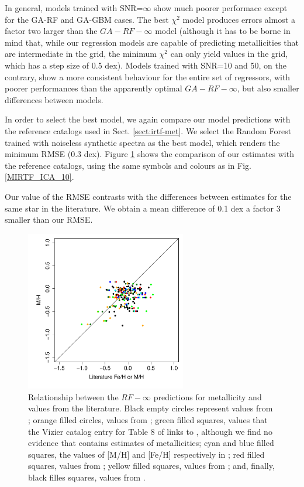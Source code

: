 In general, models trained with SNR=$\infty$ show much poorer
performace except for the GA-RF and GA-GBM cases. The best $\chi^2$
model produces errors almost a factor two larger than the
$GA-RF-\infty$ model (although it has to be borne in mind that, while
our regression models are capable of predicting metallicities that are
intermediate in the grid, the minimum $\chi^2$ can only yield values
in the grid, which has a step size of 0.5 dex). Models trained with
SNR=10 and 50, on the contrary, show a more consistent behaviour for
the entire set of regressors, with poorer performances than the
apparently optimal $GA-RF-\infty$, but also smaller differences
between models.

In order to select the best model, we again compare our model
predictions with the reference catalogs used in
Sect. \ref{sect:irtf-met}. We select the Random Forest trained with
noiseless synthetic spectra as the best model, which renders the
minimum RMSE (0.3 dex). Figure \ref{fig:ipac_mt} shows the comparison
of our estimates with the reference catalogs, using the same symbols
and colours as in Fig. \ref{MIRTF_ICA_10}.

Our value of the RMSE contrasts with the differences between estimates
for the same star in the literature. We obtain a mean difference of
0.1 dex a factor 3 smaller than our RMSE. 

\begin{figure}
 \begin{center} \includegraphics[width=7cm]{figs/ipac-figs/M-RFInf}

\caption{Relationship
 between the $RF-\infty$ predictions for metallicity and values from
 the literature.  Black empty circles represent values
 from \protect\cite{cesetti} ; orange filled circles, values
 from \protect\cite{NevesIII}; green filled squares, values that the
 Vizier catalog entry for Table 8 of \protect\cite{NevesIII} links
 to \protect\cite{Jao}, although we find no evidence
 that \protect\cite{Jao} contains estimates of metallicities; cyan and
 blue filled squares, the values of [M/H] and [Fe/H] respectively
 in \protect\cite{RA2012}; red filled squares, values
 from \protect\cite{Mann2015}; yellow filled squares, values
 from \protect\cite{Newton2014}; and, finally, black filles squares,
 values
 from \protect\cite{Gaidos2015}.}  \label{fig:ipac_mt} \end{center}
\end{figure}


